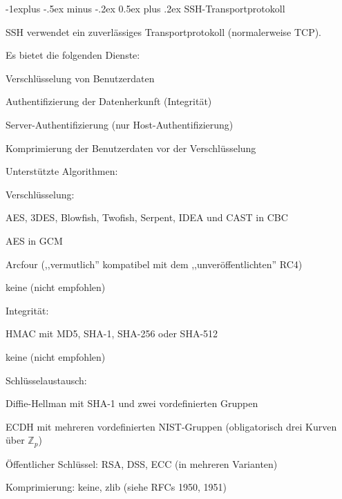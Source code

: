 \documentclass[a4paper]{article}
\makeatletter
\renewcommand{\subsection}{\@startsection{subsection}{2}{0mm}%
 {-1explus -.5ex minus -.2ex}%
 {0.5ex plus .2ex}%
 {\normalfont\normalsize\bfseries}}
\makeatother
\begin{document}
\begin{multicols}{3}
      \subsection{SSH-Transportprotokoll}
      \begin{itemize*}
            \item SSH verwendet ein zuverlässiges Transportprotokoll (normalerweise TCP).
            \item Es bietet die folgenden Dienste:
            \begin{itemize*}
                  \item Verschlüsselung von Benutzerdaten
                  \item Authentifizierung der Datenherkunft (Integrität)
                  \item Server-Authentifizierung (nur Host-Authentifizierung)
                  \item Komprimierung der Benutzerdaten vor der Verschlüsselung
            \end{itemize*}
            \item Unterstützte Algorithmen:
            \begin{itemize*}
                  \item Verschlüsselung:
                  \begin{itemize*}
                        \item AES, 3DES, Blowfish, Twofish, Serpent, IDEA und CAST in CBC
                        \item AES in GCM
                        \item Arcfour (,,vermutlich'' kompatibel mit dem ,,unveröffentlichten'' RC4)
                        \item keine (nicht empfohlen) \end{itemize*}
                  \item Integrität:
                  \begin{itemize*}
                        \item HMAC mit MD5, SHA-1, SHA-256 oder SHA-512
                        \item keine (nicht empfohlen)
                  \end{itemize*}
                  \item Schlüsselaustausch:
                  \begin{itemize*}
                        \item Diffie-Hellman mit SHA-1 und zwei vordefinierten Gruppen
                        \item ECDH mit mehreren vordefinierten NIST-Gruppen (obligatorisch drei Kurven über $\mathbb{Z}_p$)
                        \item Öffentlicher Schlüssel: RSA, DSS, ECC (in mehreren Varianten)
                  \end{itemize*}
                  \item Komprimierung: keine, zlib (siehe RFCs 1950, 1951)
            \end{itemize*}
      \end{itemize*}


\end{multicols}
\end{document}
